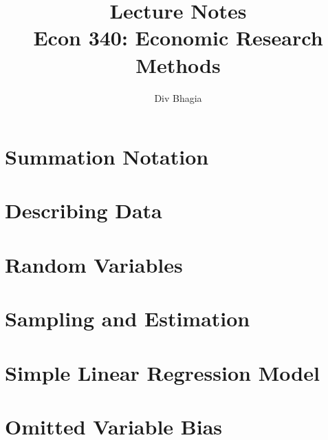 \documentclass{./../../Latex/notes}
\numberwithin{section}{chapter}
\numberwithin{subsection}{section}
\begin{document}
\title{Lecture Notes \\ Econ 340: Economic Research Methods}
\author{Div Bhagia}
\date{}

\begin{titlepage}
    \maketitle
    \tableofcontents    
\end{titlepage}

\chapter{Summation Notation}
\vspace{-6cm} 


\chapter{Describing Data}
\vspace{-6cm}


\chapter{Random Variables}
\vspace{-6cm}


\chapter{Sampling and Estimation}
\vspace{-6cm}

\newpage

\newpage



\chapter{Simple Linear Regression Model}
\vspace{-6cm}


\chapter{Omitted Variable Bias}
\vspace{-6cm}

\end{document}
